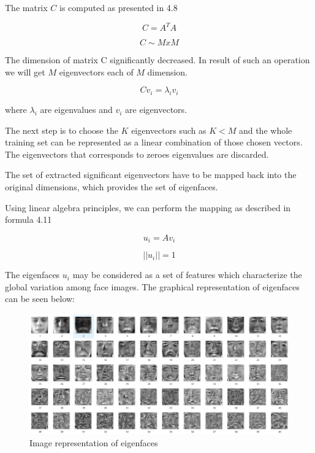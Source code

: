 The matrix $C$ is computed as presented in 4.8

 \begin{equation}
 C= A^{T}A
\end{equation}

 \begin{equation}
 C \sim M x M
\end{equation}

The dimension of matrix C significantly decreased. In result of such an operation we will get $M$ eigenvectors each of $M$ dimension. 

\begin{equation}
Cv_{i} = \lambda_{i}v_{i}
\end{equation}

where $\lambda_{i}$ are eigenvalues and $v_{i}$ are eigenvectors. 

The next step is to choose the $K$ eigenvectors such as $K < M$ and the whole training set can be represented as a linear combination of those chosen vectors. The eigenvectors that corresponds to zeroes eigenvalues are discarded. 

The set of extracted significant eigenvectors have to be mapped back into the original dimensions, which provides the set of eigenfaces. 

Using linear algebra principles, we can perform the mapping as described in formula 4.11

\begin{equation}
u_{i} = Av_{i}
\end{equation}

\begin{equation}
||u_{i}|| = 1
\end{equation}

The eigenfaces $u_{i}$ may be considered as a set of features which characterize the global variation among face images. The graphical representation of eigenfaces can be seen below: 


\begin{figure}[H]
\centering
\includegraphics[scale=0.45]{eigenfaces.jpg}
\caption{Image representation of eigenfaces}
\end{figure}


